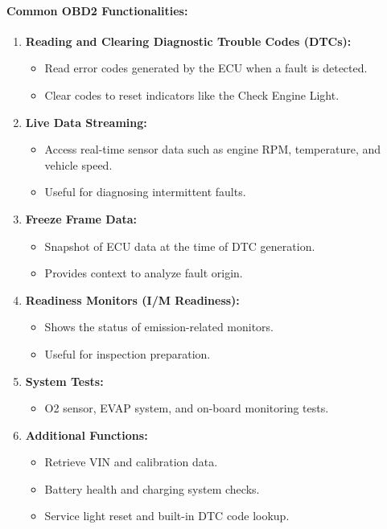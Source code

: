 \paragraph{Common OBD2 Functionalities:}
\begin{enumerate}
    \item \textbf{Reading and Clearing Diagnostic Trouble Codes (DTCs):}
    \begin{itemize}
        \item Read error codes generated by the ECU when a fault is detected.
        \item Clear codes to reset indicators like the Check Engine Light.
    \end{itemize}
    
    \item \textbf{Live Data Streaming:}
    \begin{itemize}
        \item Access real-time sensor data such as engine RPM, temperature, and vehicle speed.
        \item Useful for diagnosing intermittent faults.
    \end{itemize}

    \item \textbf{Freeze Frame Data:}
    \begin{itemize}
        \item Snapshot of ECU data at the time of DTC generation.
        \item Provides context to analyze fault origin.
    \end{itemize}

    \item \textbf{Readiness Monitors (I/M Readiness):}
    \begin{itemize}
        \item Shows the status of emission-related monitors.
        \item Useful for inspection preparation.
    \end{itemize}

    \item \textbf{System Tests:}
    \begin{itemize}
        \item O2 sensor, EVAP system, and on-board monitoring tests.
    \end{itemize}

    \item \textbf{Additional Functions:}
    \begin{itemize}
        \item Retrieve VIN and calibration data.
        \item Battery health and charging system checks.
        \item Service light reset and built-in DTC code lookup.
    \end{itemize}
\end{enumerate}

